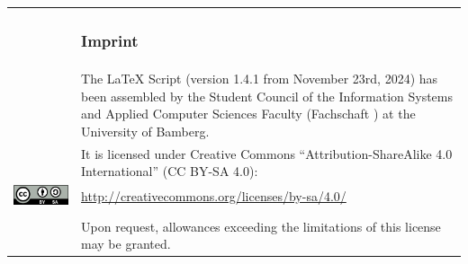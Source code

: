 \newpage
\thispagestyle{empty}

\mbox{}
\vfill

\begin{tabular}{@{}lp{9cm}}
	& \subsubsection*{Imprint} \\
	& The \LaTeX{} Script (version 1.4.1 from November 23rd, 2024) has been assembled by the Student Council of the Information Systems and Applied Computer Sciences Faculty (Fachschaft \acro{WIAI}) at the University of Bamberg. \\
	& It is licensed under Creative Commons \enquote{Attribution-ShareAlike 4.0 International} (CC BY-SA 4.0): \\
	\href{http://creativecommons.org/licenses/by-sa/4.0/}{\includegraphics[height=.5cm]{graphics/cc-by-sa}} & \url{http://creativecommons.org/licenses/by-sa/4.0/} \\ \\
	& Upon request, allowances exceeding the limitations of this license may be granted.
\end{tabular}